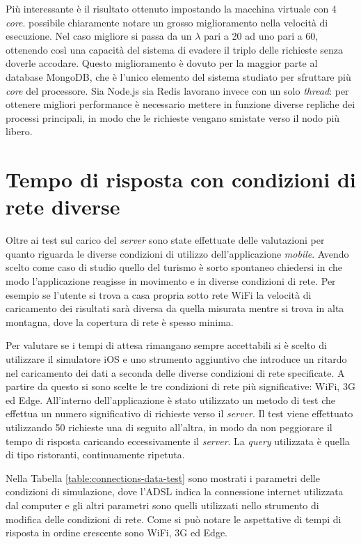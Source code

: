 Più interessante è il risultato ottenuto impostando la macchina virtuale con 4 \emph{core}. \upe possibile chiaramente notare un grosso miglioramento nella velocità di esecuzione. Nel caso migliore si passa da un $ \lambda $ pari a 20 ad uno pari a 60, ottenendo così una capacità del sistema di evadere il triplo delle richieste senza doverle accodare. Questo miglioramento è dovuto per la maggior parte al database MongoDB, che è l'unico elemento del sistema studiato per sfruttare più \emph{core} del processore. Sia Node.js sia Redis lavorano invece con un solo \emph{thread}: per ottenere migliori performance è necessario mettere in funzione diverse repliche dei processi principali, in modo che le richieste vengano smistate verso il nodo più libero.

\section{Tempo di risposta con condizioni di rete diverse\label{sec:analisi-condizioni-rete}}

Oltre ai test sul carico del \emph{server} sono state effettuate delle valutazioni per quanto riguarda le diverse condizioni di utilizzo dell'applicazione \emph{mobile}. Avendo scelto come caso di studio quello del turismo è sorto spontaneo chiedersi in che modo l'applicazione reagisse in movimento e in diverse condizioni di rete. Per esempio se l'utente si trova a casa propria sotto rete WiFi la velocità di caricamento dei risultati sarà diversa da quella misurata mentre si trova in alta montagna, dove la copertura di rete è spesso minima.

Per valutare se i tempi di attesa rimangano sempre accettabili si è scelto di utilizzare il simulatore iOS e uno strumento aggiuntivo che introduce un ritardo nel caricamento dei dati a seconda delle diverse condizioni di rete specificate. A partire da questo si sono scelte le tre condizioni di rete più significative: WiFi, 3G ed Edge.
All'interno dell'applicazione è stato utilizzato un metodo di test che effettua un numero significativo di richieste verso il \emph{server}. Il test viene effettuato utilizzando 50 richieste una di seguito all'altra, in modo da non peggiorare il tempo di risposta caricando eccessivamente il \emph{server}. La \emph{query} utilizzata è quella di tipo ristoranti, continuamente ripetuta.

Nella Tabella \ref{table:connections-data-test} sono mostrati i parametri delle condizioni di simulazione, dove l'ADSL indica la connessione internet utilizzata dal computer e gli altri parametri sono quelli utilizzati nello strumento di modifica delle condizioni di rete. Come si può notare le aspettative di tempi di risposta in ordine crescente sono WiFi, 3G ed Edge.

